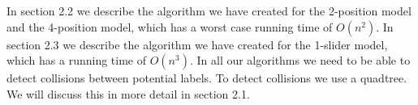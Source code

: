 \documentclass[crop=false,a4paper,oneside,11pt]{standalone}
\begin{document}
In section 2.2 we describe the algorithm we have created for the 2-position model and the 4-position model, which has a worst case running time of $O(n^2)$. In section 2.3 we describe the algorithm we have created for the 1-slider model, which has a running time of $O(n^3)$. In all our algorithms we need to be able to detect collisions between potential labels. To detect collisions we use a quadtree. We will discuss this in more detail in section 2.1.
\end{document}

